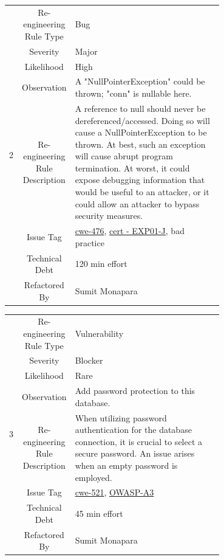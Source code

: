 \documentclass[12pt,letterpaper]{report}
\begin{document}
{\begin{table}
    \begin{tabular}{|c|c|p{0.7\linewidth}|}
    \hline   
    \multirow{8}{*}{2}
        & Re-engineering Rule Type & Bug \\
    \cline{2-3}
       & Severity &  Major \\
    \cline{2-3}
       & Likelihood &  High \\
    \cline{2-3}
       & Observation & A "NullPointerException" could be thrown; "conn" is nullable here. \\
    \cline{2-3}
       & Re-engineering Rule Description & A reference to null should never be dereferenced/accessed. Doing so will cause a NullPointerException to be thrown. At best, such an exception will cause abrupt program termination. At worst, it could expose debugging information that would be useful to an attacker, or it could allow an attacker to bypass security measures.  \\
    \cline{2-3}
       & Issue Tag & \href{https://cwe.mitre.org/data/definitions/476}{cwe-476}, \href{https://wiki.sei.cmu.edu/confluence/display/java/EXP01-J.+Do+not+use+a+null+in+a+case+where+an+object+is+required}{cert - EXP01-J}, bad practice  \\
    \cline{2-3}
       & Technical Debt & 120 min effort  \\
    \cline{2-3}
       & Refactored By & Sumit Monapara \\
    \hline
    \end{tabular}
\end{table}

\begin{table}
    \begin{tabular}{|c|c|p{0.7\linewidth}|}
    \hline   
    \multirow{8}{*}{3}
        & Re-engineering Rule Type & Vulnerability \\
    \cline{2-3}
       & Severity &  Blocker \\
    \cline{2-3}
       & Likelihood &  Rare \\
    \cline{2-3}
       & Observation & Add password protection to this database. \\
    \cline{2-3}
       & Re-engineering Rule Description & When utilizing password authentication for the database connection, it is crucial to select a secure password. An issue arises when an empty password is employed.  \\
    \cline{2-3}
       & Issue Tag & \href{https://cwe.mitre.org/data/definitions/521}{cwe-521}, \href{https://owasp.org/www-project-top-ten/2017/A3_2017-Sensitive_Data_Exposure}{OWASP-A3} \\
    \cline{2-3}
       & Technical Debt & 45 min effort  \\
    \cline{2-3}
       & Refactored By & Sumit Monapara \\
    \hline
    \end{tabular}
\end{table}

}
\end{document}
